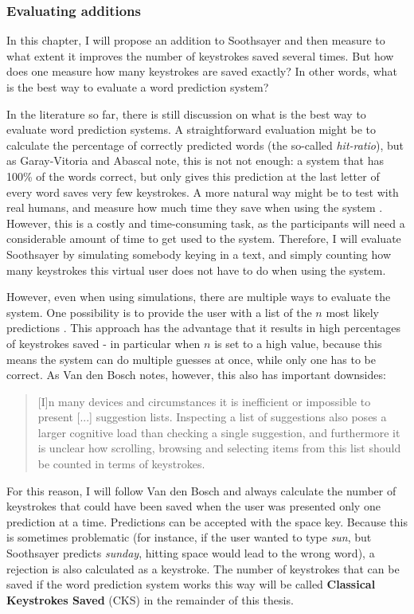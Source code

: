 \documentclass[11pt]{article}
\begin{document}
\subsubsection{Evaluating additions} \label{evaluation}
In this chapter, I will propose an addition to Soothsayer and then measure to what extent it improves the number of keystrokes saved several times. But how does one measure how many keystrokes are saved exactly? In other words, what is the best way to evaluate a word prediction system?

In the literature so far, there is still discussion on what is the best way to evaluate word prediction systems. A straightforward evaluation might be to calculate the percentage of correctly predicted words (the so-called \emph{hit-ratio}), but as Garay-Vitoria and Abascal  note, this is not not enough: a system that has 100\% of the words correct, but only gives this prediction at the last letter of every word saves very few keystrokes. A more natural way might be to test with real humans, and measure how much time they save when using the system \cite{carlberger+97,koester+98,Garay-Vitoria+06}. However, this is a costly and time-consuming task, as the participants will need a considerable amount of time to get used to the system. Therefore, I will evaluate Soothsayer by simulating somebody keying in a text, and simply counting how many keystrokes this virtual user does not have to do when using the system. 

However, even when using simulations, there are multiple ways to evaluate the system. One possibility is to provide the user with a list of the $n$ most likely predictions \cite{Lesher+99,Fazly+03}. This approach has the advantage that it results in high percentages of keystrokes saved - in particular when $n$ is set to a high value, because this means the system can do multiple guesses at once, while only one has to be correct. As Van den Bosch  notes, however, this also has important downsides: 

\begin{quotation}
[I]n many devices and circumstances it is inefficient or impossible to present [...] suggestion lists. Inspecting a list of suggestions also poses a larger cognitive load than checking a single suggestion, and furthermore it is unclear how scrolling, browsing and selecting items from this list should be counted in terms of keystrokes.
\end{quotation}

For this reason, I will follow Van den Bosch  and always calculate the number of keystrokes that could have been saved when the user was presented only one prediction at a time. Predictions can be accepted with the space key. Because this is sometimes problematic (for instance, if the user wanted to type \emph{sun}, but Soothsayer predicts \emph{sunday}, hitting space would lead to the wrong word), a rejection is also calculated as a keystroke. The number of keystrokes that can be saved if the word prediction system works this way will be called \textbf{Classical Keystrokes Saved} (CKS) in the remainder of this thesis.
\end{document}

